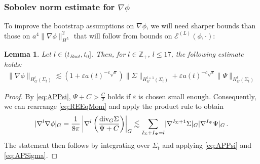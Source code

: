 \documentclass[11pt,leqno,textwidth=10cm]{amsart}
\numberwithin{equation}{section}
\theoremstyle{definition}
\theoremstyle{plain}
\newtheorem{lemma}[definition]{Lemma}
\newcommand{\1}{\mathbbm{1}}
\newcommand{\E}{\mathcal{E}}
\newcommand{\Ric}{\text{\normalfont{Ric}}}
\newcommand{\Z}{\mathbb{Z}}
\renewcommand{\epsilon}{\varepsilon}
\newcommand{\Lap}{\Delta}
\renewcommand{\div}{\text{\normalfont{div}}}
\newcommand{\change}[1]{\color{black}#1\color{black}}
\begin{document}



\subsubsection{\change{Sobolev norm estimate for $\nabla\phi$}}\label{subsubsec:int-nabla-phi}

\change{To improve the bootstrap assumptions on $\nabla\phi$, we will need sharper bounds than those on $a^4\|\nabla\phi\|_{H^L}^2$ that will follow from bounds on $\E^{(L)}(\phi,\cdot)$:

\begin{lemma}\label{lem:norm-est-nablaphi}
Let $l\in(t_{Boot},t_0]$. Then, for $l\in\Z_+$, $l\leq 17$, the following estimate holds:
\begin{align*}
\|\nabla\phi\|_{H^l_G(\Sigma_t)}\lesssim (1+\epsilon a(t)^{-c\sqrt{\epsilon}})\|\Sigma\|_{H^{l+1}_G(\Sigma_t)}+\epsilon a(t)^{-c\sqrt{\epsilon}}\|\Psi\|_{H^{l}_G(\Sigma_t)}
\end{align*}
\end{lemma}
\begin{proof}
By \eqref{eq:APPsi}, $\Psi+C>\frac{C}2$ holds if $\epsilon$ is chosen small enough. Consequently, we can rearrange \eqref{eq:REEqMom} and apply the product rule to obtain
\[\lvert\nabla^l\nabla\phi\rvert_G=\frac{1}{8\pi}\left\lvert\nabla^l\left(\frac{\div_G\Sigma}{\Psi+C}\right)\right\rvert_G\lesssim \sum_{I_\Sigma+I_\Psi=l}\lvert\nabla^{I_\Sigma+1}\Sigma\rvert_G\lvert\nabla^{I_\Psi}\Psi\rvert_G\,.\]
The statement then follows by integrating over $\Sigma_t$ and applying \eqref{eq:APPsi} and \eqref{eq:APSigma}.
\end{proof}
}
\end{document}
